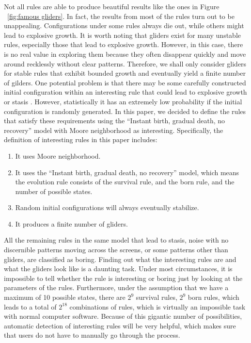 \documentclass[12pt]{article}
\numberwithin{figure}{section} %
\begin{document}
Not all rules are able to produce beautiful results like the ones in Figure ~\ref{fig:famous gliders}. In fact, the results from most of the rules turn out to be unappealing. Configurations under some rules always die out, while others might lead to explosive growth. It is worth noting that gliders exist for many unstable rules, especially those that lead to explosive growth. However, in this case, there is no real value in exploring them because they often disappear quickly and move around recklessly without clear patterns. Therefore, we shall only consider gliders for stable rules that exhibit bounded growth and eventually yield a finite number of gilders. One potential problem is that there may be some carefully constructed initial configuration within an interesting rule that could lead to explosive growth or stasis \cite{Gliders in Cellular Automata}. However, statistically it has an extremely low probability if the initial configuration is randomly generated. In this paper, we decided to define the rules that satisfy these requirements using the “Instant birth, gradual death, no recovery” model with Moore neighborhood as interesting. Specifically, the definition of interesting rules in this paper includes: 
\begin{enumerate}[topsep=0pt,itemsep=-1ex,partopsep=1ex,parsep=1ex]
\item It uses Moore neighborhood. 
\item It uses the “Instant birth, gradual death, no recovery” model, which means the evolution rule consists of the survival rule, and the born rule, and the number of possible states. 
\item Random initial configurations will always eventually stabilize. 
\item It produces a finite number of gliders. 
\end{enumerate}

All the remaining rules in the same model that lead to stasis, noise with no discernible patterns moving across the screens, or some patterns other than gliders, are classified as boring. Finding out what the interesting rules are and what the gliders look like is a daunting task. Under most circumstances, it is impossible to tell whether the rule is interesting or boring just by looking at the parameters of the rules. Furthermore, under the assumption that we have a maximum of 10 possible states, there are $2^9$ survival rules, $2^9$ born rules, which leads to a total of $2^18$ combinations of rules, which is virtually an impossible task with normal computer software. Because of this gigantic number of possibilities, automatic detection of interesting rules will be very helpful, which makes sure that users do not have to manually go through the process. 
\end{document}
